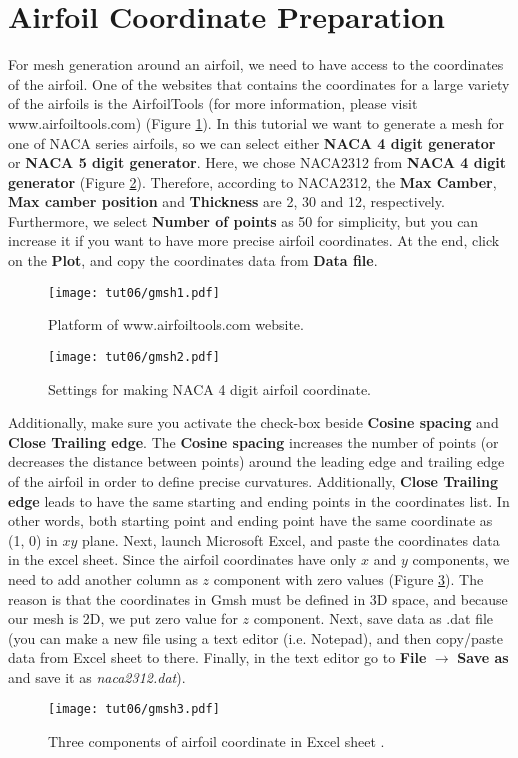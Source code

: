 \section{Airfoil Coordinate Preparation}
For mesh generation around an airfoil, we need to have access to the coordinates of the airfoil. One of the websites that contains the coordinates for a large variety of the airfoils is the AirfoilTools (for more information, please visit www.airfoiltools.com) (Figure \ref{fig6:gmsh1}). In this tutorial we want to generate a mesh for one of NACA series airfoils, so we can select either \textbf{NACA 4 digit generator} or \textbf{NACA 5 digit generator}. Here, we chose NACA2312 from \textbf{NACA 4 digit generator} (Figure \ref{fig6:gmsh2}). Therefore, according to NACA2312, the \textbf{Max Camber}, \textbf{Max camber position} and \textbf{Thickness} are 2, 30 and 12, respectively. Furthermore, we select \textbf{Number of points} as 50 for simplicity, but you can increase it if you want to have more precise airfoil coordinates. At the end, click on the \textbf{Plot}, and copy the coordinates data from \textbf{Data file}.
\begin{figure}[htbp]
    \centering
    \texttt{[image: tut06/gmsh1.pdf]}
    \caption{Platform of www.airfoiltools.com website.}
    \label{fig6:gmsh1}
\end{figure}
\begin{figure}[htbp]
    \centering
    \texttt{[image: tut06/gmsh2.pdf]}
    \caption{Settings for making NACA 4 digit airfoil coordinate.}
    \label{fig6:gmsh2}
\end{figure}
Additionally, make sure you activate the check-box beside \textbf{Cosine spacing} and \textbf{Close Trailing edge}. The \textbf{Cosine spacing} increases the number of points (or decreases the distance between points) around the leading edge and trailing edge of the airfoil in order to define precise curvatures. Additionally, \textbf{Close Trailing edge} leads to have the same starting and ending points in the coordinates list. In other words, both starting point and ending point have the same coordinate as (1, 0) in $xy$ plane. 
Next, launch Microsoft Excel, and paste the coordinates data in the excel sheet. Since the airfoil coordinates have only $x$ and $y$ components, we need to add another column as $z$ component with zero values (Figure \ref{fig6:gmsh3}). The reason is that the coordinates in Gmsh must be defined in 3D space, and because our mesh is 2D, we put zero value for $z$ component. Next, save data as .dat file (you can make a new file using a text editor (i.e. Notepad), and then copy/paste data from Excel sheet to there. Finally, in the text editor go to \textbf{File} $\rightarrow$ \textbf{Save as} and save it as \textit{naca2312.dat}).
\begin{figure}[htbp]
    \centering
    \texttt{[image: tut06/gmsh3.pdf]}
    \caption{Three components of airfoil coordinate in Excel sheet .}
    \label{fig6:gmsh3}
\end{figure}
